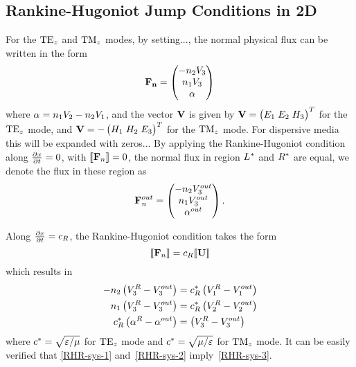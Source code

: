 \subsection{Rankine-Hugoniot Jump Conditions in 2D}
For the $\textrm{TE}_{z}$ and $\textrm{TM}_{z}$ modes, by setting..., the normal physical flux can be
written in the form
$$
\mathbf{\mathbf{F}_n} = 
\begin{pmatrix}
  - n_2 V_3 \\
  n_1 V_3 \\
  \alpha
\end{pmatrix}
$$
where $ \alpha = n_1 V_2 - n_2 V_1 $, and the vector $\mathbf{V}$ is given by $
\mathbf{V} = 
  \begin{pmatrix} 
    E_1 \; E_2 \; H_3
  \end{pmatrix}^T
$ for the $\textrm{TE}_{z}$ mode, and $
\mathbf{V} = 
  -
  \begin{pmatrix} 
    H_1 \; H_2 \; E_3
  \end{pmatrix}^T
  $ for the $\textrm{TM}_{z}$ mode.
For dispersive media this will be expanded with zeros...
By applying the Rankine-Hugoniot condition along $\frac{\partial x}{\partial t} = 0$, with $ \llbracket  \mathbf{F}_n  \rrbracket = 0 $, the normal flux in region $L^*$
and $R^*$ are equal, we denote the flux in these region as
$$
\mathbf{F}_n^{out} = 
\begin{pmatrix}
  - n_2 V_3^{out} \\
  n_1 V_3^{out} \\
  \alpha^{out}
\end{pmatrix} .
$$

Along $\frac{\partial x}{\partial t} = c_{R}$, the Rankine-Hugoniot condition takes the form
$$
\llbracket  \mathbf{F}_n  \rrbracket = c_{R} \llbracket  \mathbf{U}  \rrbracket
$$
which results in
\begin{align}
-n_2 \left(V_3^{R} - V_3^{out} \right) &= c^{*}_R \left( V_1^{R} - V_1^{out} \right) \label{RHR-sys-1} \\
n_1 \left(V_3^{R} - V_3^{out} \right) &= c^{*}_R  \left( V_2^{R} - V_2^{out} \right) \label{RHR-sys-2} \\
c^{*}_R \left(\alpha^{R} - \alpha^{out} \right) &= \left( V_3^{R} - V_3^{out} \right) \label{RHR-sys-3}
\end{align}
where $c^{*} = \sqrt{\varepsilon/\mu}$ for $\textrm{TE}_{z}$ mode and $c^{*} =
\sqrt{\mu/\varepsilon}$ for $\textrm{TM}_{z}$ mode. It can be easily verified that
\eqref{RHR-sys-1} and~\eqref{RHR-sys-2} imply~\eqref{RHR-sys-3}.

